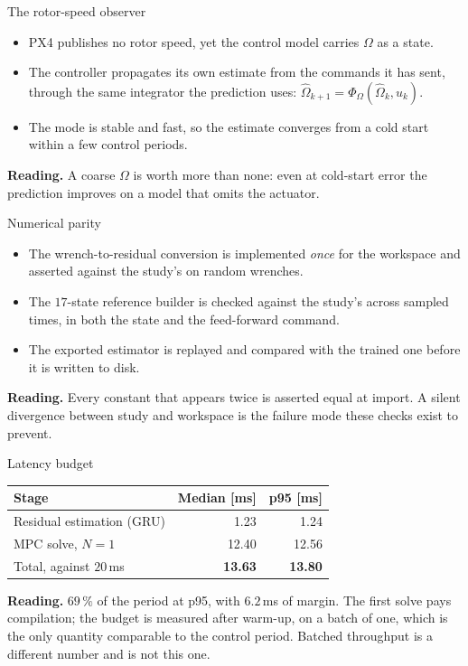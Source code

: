 \documentclass[10pt]{beamer}
\newcommand{\takeaway}[1]{\par\vfill{\footnotesize\textbf{Reading.} #1\par}}
\begin{document}
\begin{frame}{The rotor-speed observer}
  \begin{itemize}
    \item PX4 publishes no rotor speed, yet the control model carries
      $\Omega$ as a state.
    \item The controller propagates its own estimate from the commands it has
      sent, through the same integrator the prediction uses:
      $\hat\Omega_{k+1}=\Phi_\Omega(\hat\Omega_k,u_k)$.
    \item The mode is stable and fast, so the estimate converges from a cold
      start within a few control periods.
  \end{itemize}
  \takeaway{A coarse $\Omega$ is worth more than none: even at cold-start
    error the prediction improves on a model that omits the actuator.}
\end{frame}

\begin{frame}{Numerical parity}
  \begin{itemize}
    \item The wrench-to-residual conversion is implemented \emph{once} for
      the workspace and asserted against the study's on random wrenches.
    \item The $17$-state reference builder is checked against the study's
      across sampled times, in both the state and the feed-forward command.
    \item The exported estimator is replayed and compared with the trained
      one before it is written to disk.
  \end{itemize}
  \takeaway{Every constant that appears twice is asserted equal at import.
    A silent divergence between study and workspace is the failure mode these
    checks exist to prevent.}
\end{frame}

\begin{frame}{Latency budget}
  \begin{table}
    \centering
    \small
    \begin{tabular}{lrr}
      \toprule
      Stage & Median [ms] & p95 [ms] \\
      \midrule
      Residual estimation (GRU) & 1.23 & 1.24 \\
      MPC solve, $N{=}1$        & 12.40 & 12.56 \\
      \midrule
      Total, against $20\,$ms   & \textbf{13.63} & \textbf{13.80} \\
      \bottomrule
    \end{tabular}
  \end{table}
  \takeaway{$69\,\%$ of the period at p95, with $6.2\,$ms of margin. The first
    solve pays compilation; the budget is measured after warm-up, on a batch of
    one, which is the only quantity comparable to the control period. Batched
    throughput is a different number and is not this one.}
\end{frame}
\end{document}

